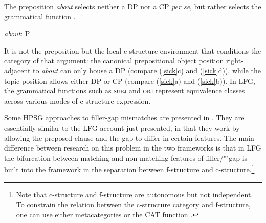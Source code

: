 \zl
The preposition \textit{about} selects neither a DP nor a CP \textit{per se}, but rather selects the grammatical function  .

\eal \label{talk-about}
{{\it about}\/: P}\qquad{}    
\zl


\noindent
It is not the preposition but the local c-structure environment that conditions the category of that argument: the canonical prepositional object position right-adjacent to \textit{about} can only house a DP (compare (\ref{sick}c) and (\ref{sick}d)), while the topic position allows either DP or CP (compare (\ref{sick}a) and (\ref{sick}b)).  In LFG, the grammatical functions such as \textsc{subj} and \textsc{obj} represent equivalence classes across various modes of c-structure expression.  

Some HPSG approaches to filler-gap mismatches are presented in .  They are essentially similar to the LFG account just presented, in that they work by allowing the preposed clause and the gap to differ in certain features.  The main difference between research on this problem in the two frameworks is that in LFG the bifurcation between matching and non-matching features of filler/""gap  is built into the framework in the separation between f-structure and c-structure.\footnote{Note that c-structure and f-structure are autonomous but not independent.  To constrain the relation between the c-structure category and f-structure, one can use either metacategories \citep[691--698]{dalrymple;ea19} or the CAT function \citep[265]{dalrymple;ea19}.}  



